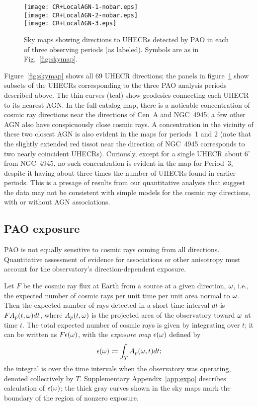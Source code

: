 \begin{figure}
\begin{centering}
\texttt{[image: CR+LocalAGN-1-nobar.eps]}\\
\texttt{[image: CR+LocalAGN-2-nobar.eps]}\\
\texttt{[image: CR+LocalAGN-3.eps]}
\end{centering}
\caption{Sky maps showing directions to UHECRs detected by PAO in
each of three observing periods (as labeled).  Symbols are as in
Fig.~\ref{fig:skymap}.}
\label{fig:skymaps}
\end{figure}

Figure~\ref{fig:skymap} shows all 69 UHECR directions; the panels in
figure~\ref{fig:skymaps} show subsets of the UHECRs corresponding to the
three PAO analysis periods described above.  The thin curves (teal) show
geodesics connecting each UHECR to its nearest AGN.  In the full-catalog map,
there is a noticable concentration of cosmic ray directions near the
directions of Cen~A and NGC~4945; a few other AGN also have conspicuously
close cosmic rays.  A concentration in the vicinity of these two closest AGN
is also evident in the maps for periods~1 and 2 (note that the slightly
extended red tissot near the direction of NGC~4945 corresponds to two nearly
coincident UHECRs).  Curiously, except for a single UHECR about $6^\circ$
from NGC~4945, no such concentration is evident in the map for Period~3,
despite it having about three times the number of UHECRs found in earlier
periods.  This is a presage of results from our quantitative analysis that
suggest the data may not be consistent with simple models for the cosmic ray
directions, with or without AGN associations.

\subsection{PAO exposure}

PAO is not equally sensitive to cosmic rays coming from all directions.
Quantitative assessment of evidence for associations or other anisotropy must
account for the observatory's direction-dependent exposure.

Let $F$ be the cosmic ray flux at Earth from a source at a given direction,
$\omega$, i.e., the expected number of cosmic rays per unit time per unit
area normal to $\omega$.   Then the expected number of rays detected in a
short time interval $dt$ is $F A_p(t,\omega) dt$, where $A_p(t,\omega)$ is
the projected area of the observatory toward $\omega$ at time $t$. The total
expected number of cosmic rays is given by integrating over $t$; it can be
written as $F\epsilon(\omega)$, with the {\em exposure map} $\epsilon(\omega)$
defined by
\begin{equation}
\expo(\tdrxn) \coloneqq \int_T  A_p(\tdrxn,t) dt;
\label{expo-def-main}
\end{equation}
the integral is over the time intervals when the observatory was operating,
denoted collectively by $T$.
Supplementary Appendix~\ref{app:expo} describes calculation of
$\epsilon(\omega)$; the thick gray curves shown in the sky maps mark the
boundary of the region of nonzero exposure.
